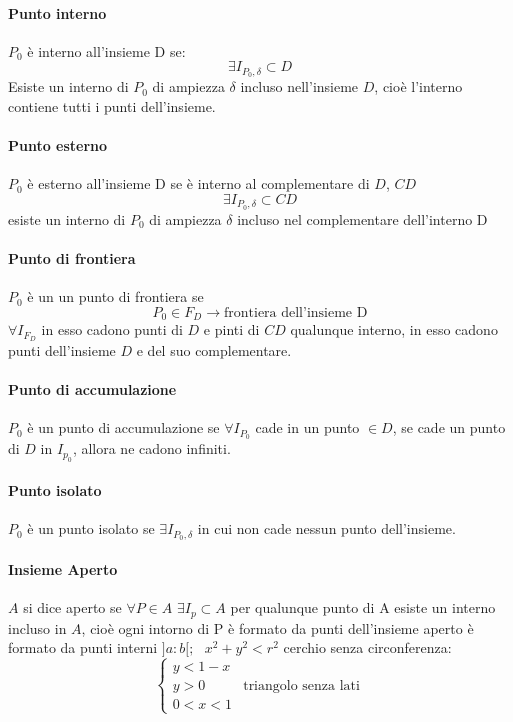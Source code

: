 \paragraph{Punto interno} $P_0$ è interno all'insieme D se:
\begin{equation}
    \exists I_{P_0,\delta} \subset D
\end{equation}
Esiste un interno di $P_0$ di ampiezza $\delta$ incluso nell'insieme $D$, cioè l'interno contiene tutti i
punti dell'insieme.
\paragraph{Punto esterno} $P_0$ è esterno all'insieme D se è interno al complementare di $D$, $CD$
\begin{equation}
    \exists I_{P_0,\delta}\subset CD
\end{equation}
esiste un interno di $P_0$ di ampiezza $\delta$ incluso nel complementare dell'interno D
\paragraph{Punto di frontiera} $P_0$ è un un punto di frontiera se
\begin{equation}
    P_0\in F_D \to \text{frontiera dell'insieme D}
\end{equation}
$\forall I_{F_D}$ in esso cadono punti di $D$ e pinti di $CD$ qualunque interno, in esso cadono punti
dell'insieme $D$ e del suo complementare.
\paragraph{Punto di accumulazione}
$P_0$ è un punto di accumulazione se $\forall I_{P_0}$ cade in un punto $\in D$, se cade un punto di $D$
in $I_{p_0}$, allora ne cadono infiniti.
\paragraph{Punto isolato}
$P_0$ è un punto isolato se $\exists I_{P_0,\delta}$ in cui non cade nessun punto dell'insieme.
\paragraph{Insieme Aperto}
\begin{defi}
    $A$ si dice aperto se $\forall P \in A$ $\exists I_p \subset A$ per qualunque punto di A esiste un interno
    incluso in $A$, cioè ogni intorno di P è formato da punti dell'insieme aperto è formato da punti interni
    $]a:b[;\text{ } x^2+y^2<r^2$ cerchio senza circonferenza:
    \begin{equation}
        \begin{cases}
            y<1-x\\
            y>0 & \text{triangolo senza lati}\\
            0<x<1
        \end{cases}
    \end{equation}
\end{defi}
